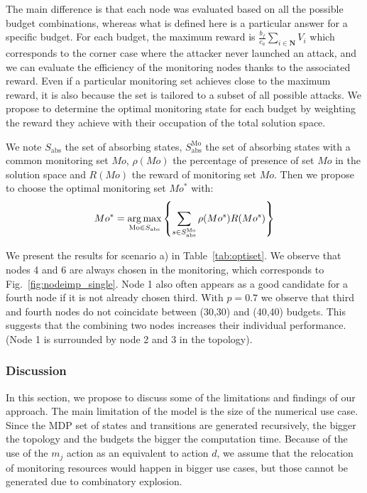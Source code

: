 The main difference is that each node was evaluated based on all the possible budget combinations, whereas what is defined here is a particular answer for a specific budget.
For each budget, the maximum reward is $\frac{b_f}{c_a} \sum\limits_{i \in \textbf{N}}V_i $ which corresponds to the corner case where the attacker never launched an attack, and we can evaluate the efficiency of the   monitoring nodes thanks to the associated reward.
Even if a particular monitoring set achieves close to the maximum reward, it is also because the set is tailored to a subset of all possible attacks.
We propose to determine the optimal monitoring state for each budget by weighting the reward they achieve with their occupation of the total solution space.

We note $S_{\text{abs}}$ the set of absorbing states, $S^{\text{Mo}}_{\text{abs}}$ the set of absorbing states with a common  monitoring set $Mo$, $\rho(Mo)$ the percentage of presence of set $Mo$ in the solution space and $R(Mo)$ the reward of monitoring set $Mo$.
Then we propose to choose the optimal monitoring set $Mo^*$ with:
\begin{equation}
    Mo^* = \operatorname*{arg\,max}\limits_{\text{Mo} \in S_{\text{abs}}} \left \{\sum\limits_{s \in S^{\text{Mo}}_{\text{abs}}}\rho(Mo^s)R(Mo^s) \right \}
\end{equation}

We present the results for scenario a) in Table~\ref{tab:optiset}.
We observe that nodes 4 and 6 are always chosen in the monitoring, which corresponds to Fig.~\ref{fig:nodeimp_single}.
Node 1 also often appears as a good candidate for a fourth node if it is not already chosen third.
With $p=0.7$ we observe that third and fourth nodes do not coincidate between (30,30) and (40,40) budgets.
This suggests that the combining two nodes increases their individual performance.
(Node 1 is surrounded by node 2 and 3 in the topology).



\subsubsection{Discussion}
\label{sec:discussion}
In this section, we propose to discuss some of the limitations and findings of our approach.
The main limitation of the model is the size of the numerical use case. Since the MDP set of states and transitions are generated recursively, the bigger the topology and the budgets the bigger the computation time.
Because of the use of the $m_j$ action as an equivalent to action $d$, we assume that the relocation of monitoring resources would happen in bigger use cases, but those cannot be generated due to combinatory explosion.

